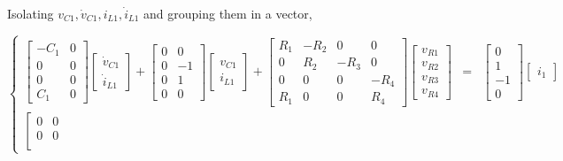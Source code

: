 \begin{example}
	Isolating $v_{C1},\dot{v}_{C1},i_{L1},\dot{i}_{L1}$ and grouping them in a vector,

\begin{equation} %
\left\{\begin{array}{rcl}
	\left[\begin{array}{ccccccc}
	-C_1 & 0 \\[3mm]
	   0 & 0\\[3mm]
	   0 & 0\\[3mm]
	 C_1 & 0 
	\end{array}\right]
%
	\left[\begin{array}{c}
		\dot{v}_{C1} \\[3mm] \dot{i}_{L1}
	\end{array}\right]
+
	\left[\begin{array}{ccccccc}
	 0 &  0 \\[3mm]
	 0 & -1 \\[3mm]
	 0 &  1 \\[3mm]
	 0 &  0 
	\end{array}\right]
%
	\left[\begin{array}{c}
		v_{C1} \\[3mm] i_{L1}
	\end{array}\right]
+
	\left[\begin{array}{ccccccc}
	R_1 & -R_2 &  0   & 0    \\[3mm]
	  0 &  R_2 & -R_3 & 0    \\[3mm]
	  0 &    0 &  0   & -R_4 \\[3mm]
	R_1 &    0 &  0   &  R_4 
	\end{array}\right]
%
	\left[\begin{array}{c}
		v_{R1} \\[3mm] v_{R2} \\[3mm] v_{R3} \\[3mm] v_{R4}
	\end{array}\right] &=&
%
	\left[\begin{array}{c}
		0 \\[3mm] 1 \\[3mm] -1 \\[3mm] 0
	\end{array}\right]
%
	\left[\begin{array}{c}
		i_1
	\end{array}\right]  \\[30mm]
%
\left[\begin{array}{ccccccc}
	 0 &  0 \\[3mm]
	 0 &  0 \\[3mm]

\end{array}
\end{array}
\end{equation}
\end{example}
